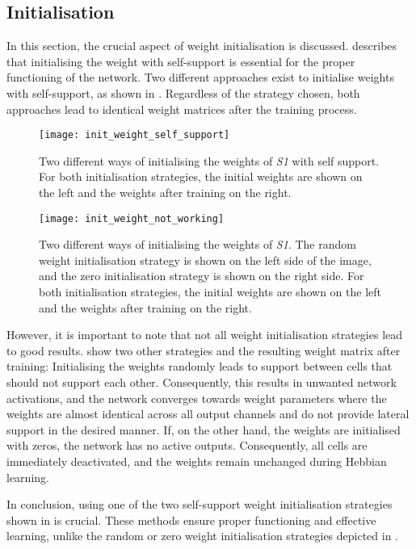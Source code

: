 \subsection{Initialisation}
In this section, the crucial aspect of weight initialisation is discussed.
 describes that initialising the weight with self-support is essential for the proper functioning of the network.
Two different approaches exist to initialise weights with self-support, as shown in .
Regardless of the strategy chosen, both approaches lead to identical weight matrices after the training process.
\begin{figure}[h]
    \centering
    \texttt{[image: init\_weight\_self\_support]}
    \caption[Weight initialisation with self-support]{Two different ways of initialising the weights of \emph{S1} with self support. For both initialisation strategies, the initial weights are shown on the left and the weights after training on the right.}
\end{figure}
\begin{figure}[h]
    \centering
    \texttt{[image: init\_weight\_not\_working]}
    \caption[Random weight initialisation]{Two different ways of initialising the weights of \emph{S1}. The random weight initialisation strategy is shown on the left side of the image, and the zero initialisation strategy is shown on the right side. For both initialisation strategies, the initial weights are shown on the left and the weights after training on the right.}
\end{figure}

However, it is important to note that not all weight initialisation strategies lead to good results. 
 show two other strategies and the resulting weight matrix after training:
Initialising the weights randomly leads to support between cells that should not support each other.
Consequently, this results in unwanted network activations, and the network converges towards weight parameters where the weights are almost identical across all output channels and do not provide lateral support in the desired manner.
If, on the other hand, the weights are initialised with zeros, the network has no active outputs. Consequently, all cells are immediately deactivated, and the weights remain unchanged during Hebbian learning.

In conclusion, using one of the two self-support weight initialisation strategies shown in  is crucial. These methods ensure proper functioning and effective learning, unlike the random or zero weight initialisation strategies depicted in .

